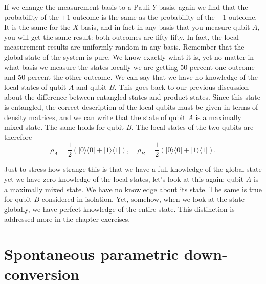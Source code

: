 
If we change the measurement basis to a Pauli $Y$ basis, again we find that the probability of the $+1$ outcome is the same as the probability of the $-1$ outcome. It is the same for the $X$ basis, and in fact in any basis that you measure qubit $A$, you will get the same result: both outcomes are fifty-fifty. In fact, the local measurement results are uniformly random in any basis.
Remember that the global state of the system is pure.
We know exactly what it is, yet no matter in what basis we measure the states locally we are getting 50 percent one outcome and 50 percent the other outcome.
We can say that we have no knowledge of the local states of qubit $A$ and qubit $B$.
This goes back to our previous discussion about the difference between entangled states and product states. 
Since this state is entangled, the correct description of the local qubits must be given in terms of density matrices, and we can write that the state of qubit $A$ is a maximally mixed state.
The same holds for qubit $B$.
The local states of the two qubits are therefore
\begin{equation}
    \rho_A=\frac{1}{2}(|0\rangle\langle 0|+| 1\rangle\langle 1|), \quad
    \rho_B=\frac{1}{2}(|0\rangle\langle 0|+| 1\rangle\langle 1|).
\end{equation}

Just to stress how strange this is that we have a full knowledge of the global state yet we have zero knowledge of the local states, let's look at this again: qubit $A$ is a maximally mixed state. We have no knowledge about its state. The same is true for qubit $B$ considered in isolation. Yet, somehow, when we look at the state globally, we have perfect knowledge of the entire state. This distinction is addressed more in the chapter exercises.


\section{Spontaneous parametric down-conversion}
\label{sec:4-4_spdc}

